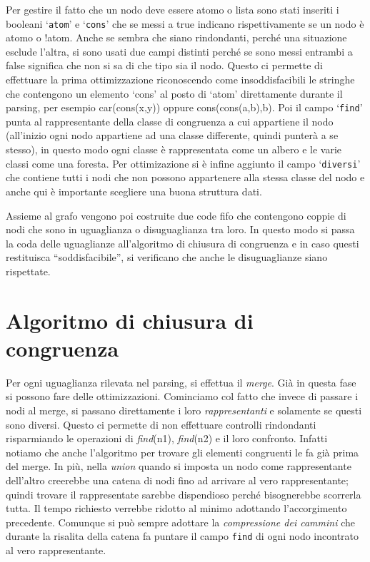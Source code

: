 \documentclass[a4paper,11pt]{article} %
\newcommand{\campo}{\texttt}
\begin{document}
Per gestire il fatto che un nodo deve essere atomo
o lista sono stati inseriti i booleani `\campo{atom}' e `\campo{cons}' che se messi a true indicano
rispettivamente se un nodo \`e atomo o !atom. Anche se sembra che siano rindondanti, perch\'e 
una situazione esclude l'altra, si sono usati due campi distinti perch\'e se sono messi entrambi a
false significa che non si sa di che tipo sia il nodo.
Questo ci permette di effettuare la prima ottimizzazione riconoscendo come insoddisfacibili le stringhe 
che contengono un elemento `cons' al posto di `atom' direttamente durante il parsing,
 per esempio car(cons(x,y)) oppure cons(cons(a,b),b). 
Poi il campo `\campo{find}' punta al 
rappresentante della classe di congruenza a cui appartiene il nodo (all'inizio ogni nodo appartiene
ad una classe differente, quindi punter\`a a se stesso), in questo modo ogni classe \`e rappresentata
come un albero e le varie classi come una foresta.
Per 
ottimizazione %
si \`e infine aggiunto il campo `\campo{diversi}' che contiene
tutti i nodi che non possono appartenere alla stessa classe del nodo e anche qui \`e importante scegliere
una buona struttura dati.

Assieme al grafo vengono poi costruite due code fifo che contengono coppie di nodi che sono in uguaglianza
o disuguaglianza tra loro. In questo modo si passa la coda delle uguaglianze all'algoritmo di chiusura
di congruenza e in caso questi restituisca ``soddisfacibile'', si verificano che anche le disuguaglianze 
siano rispettate.

\vspace{-1ex}
\section{Algoritmo di chiusura di congruenza}\label{sec: algo cc}
Per ogni uguaglianza rilevata nel parsing, si effettua il \emph{merge}. %
Gi\`a in questa fase si possono fare delle ottimizzazioni. Cominciamo col fatto che invece di
passare i nodi al merge, si passano direttamente i loro \emph{rappresentanti} e solamente 
se questi sono diversi. Questo ci permette di non effettuare %
controlli rindondanti risparmiando le operazioni di \emph{find}(n1), \emph{find}(n2) e il loro confronto.
Infatti notiamo che anche l'algoritmo per trovare gli elementi congruenti
le fa gi\`a
prima
del merge. %
In pi\`u, nella \emph{union} quando si imposta un nodo come rappresentante dell'altro
creerebbe una catena di nodi fino ad arrivare al vero rappresentante; quindi 
trovare il rappresentate sarebbe dispendioso perch\'e bisognerebbe scorrerla tutta.
Il tempo richiesto verrebbe ridotto al minimo adottando l'accorgimento precedente.
Comunque si pu\`o sempre adottare la \emph{compressione dei cammini} che durante la
risalita della catena fa puntare il campo \campo{find} di ogni nodo incontrato al 
vero rappresentante.
\end{document}
